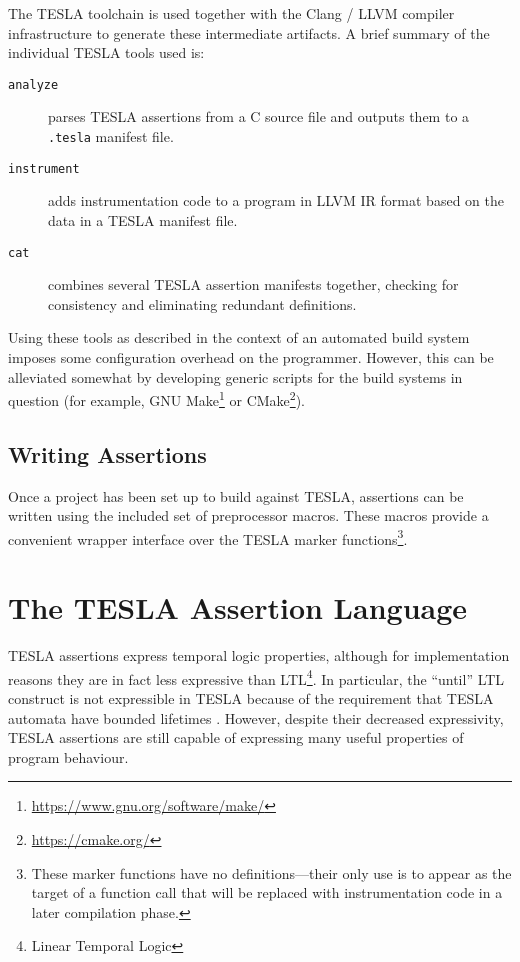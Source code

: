 The TESLA toolchain is used together with the Clang / LLVM compiler
infrastructure to generate these intermediate artifacts. A brief summary of the
individual TESLA tools used is:

\begin{description}
  \item[\texttt{analyze}] parses TESLA assertions from a C source file and
    outputs them to a \texttt{.tesla} manifest file.
  \item[\texttt{instrument}] adds instrumentation code to a program in LLVM IR
    format based on the data in a TESLA manifest file.
  \item[\texttt{cat}] combines several TESLA assertion manifests together,
    checking for consistency and eliminating redundant definitions.
\end{description}

Using these tools as described in the context of an automated build system
imposes some configuration overhead on the programmer. However, this can be
alleviated somewhat by developing generic scripts for the build systems in
question (for example, GNU
Make\footnote{\url{https://www.gnu.org/software/make/}} or
CMake\footnote{\url{https://cmake.org/}}).

\subsection{Writing Assertions}

Once a project has been set up to build against TESLA, assertions can be written
using the included set of preprocessor macros. These macros provide a convenient
wrapper interface over the TESLA marker functions\footnote{These marker
functions have no definitions---their only use is to appear as the target of a
function call that will be replaced with instrumentation code in a later
compilation phase.}.

\section{The TESLA Assertion Language} \label{sec:assertions}

TESLA assertions express temporal logic properties, although for implementation
reasons they are in fact less expressive than LTL\footnote{Linear Temporal
Logic}. In particular, the ``until'' LTL construct \cite{pnueli_temporal_1977} is
not expressible in TESLA because of the requirement that TESLA automata have
bounded lifetimes \cite{anderson_tesla:_2014}. However, despite their decreased
expressivity, TESLA assertions are still capable of expressing many useful
properties of program behaviour.

